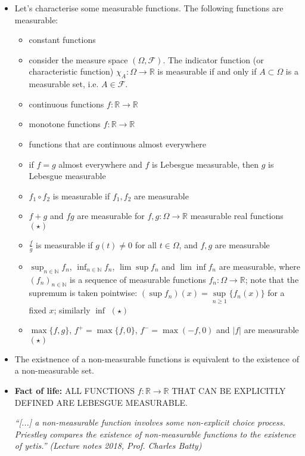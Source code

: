 \documentclass[a4paper, 11pt]{article}
\theoremstyle{plain}
\theoremstyle{definition}
\begin{document}
\begin{itemize}
	\item Let's characterise some measurable functions. The following functions are measurable:
		\begin{itemize}
			\item constant functions
			\item consider the measure space $(\Omega, \mathcal F)$. The indicator function (or characteristic function) $\chi_A: \Omega \to \mathbb R$ is measurable if and only if $A \subset \Omega$ is a measurable set, i.e. $A \in \mathcal F$.
			\item continuous functions $f: \mathbb R \to \mathbb R$
			\item monotone functions $f: \mathbb R \to \mathbb R$
			\item functions that are continuous almost everywhere
			\item if $f = g$ almost everywhere  and $f$ is Lebesgue measurable, then $g$ is Lebesgue measurable
			\item $f_1 \circ f_2$ is measurable if $f_1,f_2$ are measurable
			\item $f+g$ and $fg$ are measurable for $f,g: \Omega \to \mathbb R$ measurable real functions $(\star)$
			\item $\frac{f}{g}$ is measurable if $g(t) \neq 0$ for all $t \in \Omega$, and $f,g$ are measurable
			\item $\sup_{n \in \mathbb N} f_n$, $\inf_{n \in \mathbb N} f_n$, $\lim\sup f_n$ and  $\lim \inf f_n$ are measurable, where $(f_n)_{n \in \mathbb N}$ is a sequence of measurable functions $f_n: \Omega \to \mathbb R$; note that the supremum is taken pointwise: $(\sup f_n)(x) = \sup\limits_{n \geq 1}\{ f_n(x) \}$ for a fixed $x$; similarly $\inf$ $(\star)$
			\item $\max \{f,g\}$, $f^+=\max\{f,0\}$, $f^-=\max(-f,0)$ and $|f|$ are measurable $(\star)$
		\end{itemize}
	
	\item The existnence of a non-measurable functions is equivalent to the existence of a non-measurable set. 
	
	\item \textbf{Fact of life:} ALL FUNCTIONS $f : \mathbb R \to \mathbb R$ THAT CAN BE EXPLICITLY DEFINED ARE LEBESGUE MEASURABLE.
	
	\textit{``[...] a non-measurable function involves some non-explicit choice process. Priestley compares the existence of non-measurable functions to the existence of yetis.'' (Lecture notes 2018, Prof. Charles Batty)}
\end{itemize}
\end{document}
